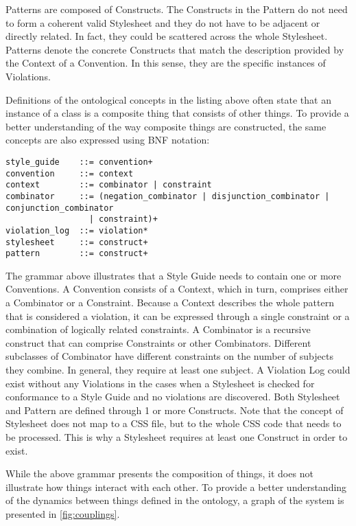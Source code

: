 Patterns are composed of Constructs. The Constructs in the Pattern do not need to form a coherent
valid Stylesheet and they do not have to be adjacent or directly related. In fact, they could be
scattered across the whole Stylesheet. Patterns denote the concrete Constructs that match the
description provided by the Context of a Convention. In this sense, they are the specific instances
of Violations.

Definitions of the ontological concepts in the listing above often state that an instance of a
class is a composite thing that consists of other things. To provide a better understanding of the
way composite things are constructed, the same concepts are also expressed using BNF notation:

\begin{snippet}
\begin{verbatim}
style_guide    ::= convention+
convention     ::= context
context        ::= combinator | constraint
combinator     ::= (negation_combinator | disjunction_combinator | conjunction_combinator 
                 | constraint)+
violation_log  ::= violation*
stylesheet     ::= construct+
pattern        ::= construct+
\end{verbatim}
\end{snippet}

The grammar above illustrates that a Style Guide needs to contain one or more Conventions. A
Convention consists of a Context, which in turn, comprises either a Combinator or a Constraint.
Because a Context describes the whole pattern that is considered a violation, it can be expressed
through a single constraint or a combination of logically related constraints. A Combinator is a
recursive construct that can comprise Constraints or other Combinators. Different subclasses of
Combinator have different constraints on the number of subjects they combine. In general, they
require at least one subject. A Violation Log could exist without any Violations in the
cases when a Stylesheet is checked for conformance to a Style Guide and no violations are
discovered. Both Stylesheet and Pattern are defined through 1 or more Constructs. Note that the
concept of Stylesheet does not map to a CSS file, but to the whole CSS code that needs to be
processed. This is why a Stylesheet requires at least one Construct in
order to exist.

While the above grammar presents the composition of things, it does not illustrate how things
interact with each other. To provide a better understanding of the dynamics between things defined
in the ontology, a graph of the system is presented in \autoref{fig:couplings}.

